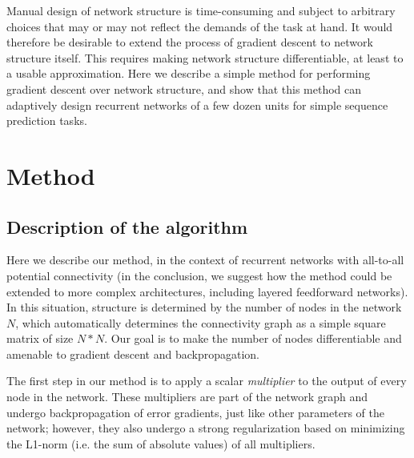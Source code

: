 \documentclass{article}
\begin{document}
Manual design of network structure is time-consuming and subject to arbitrary
choices that may or may not reflect the demands of the task at hand. It would
therefore be desirable to extend the process of gradient descent to network
structure itself. This requires making network structure differentiable, at
least to a usable approximation. Here we describe a simple method
for performing gradient descent over network structure, and show that this
method can adaptively design recurrent networks of a few dozen units for simple
sequence prediction
tasks.


\section{Method}

\subsection{Description of the algorithm}

Here we describe our method, in the context of recurrent networks with
all-to-all potential connectivity (in the conclusion, we suggest how the method
could be extended to more complex architectures, including layered feedforward
networks). In this situation, structure is determined by the number of nodes in
the network $N$, which automatically determines the connectivity graph as a
simple square matrix of size $N*N$. Our goal is to make the number of nodes
differentiable and amenable to gradient descent and backpropagation. 

The first step in our method is to apply a scalar \textit{multiplier} to
the output of every node in the network. These multipliers are part of the
network graph and undergo backpropagation of error gradients,
just like other parameters of the network; however, they also undergo a strong
regularization based on minimizing the L1-norm (i.e. the sum of absolute
values) of all multipliers. 
\end{document}
